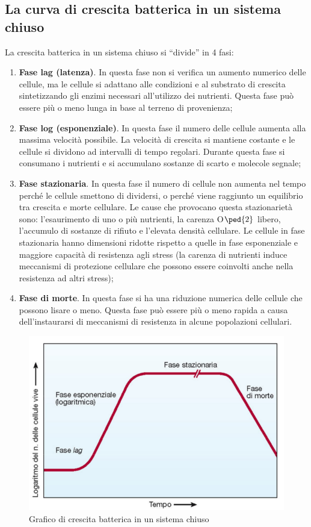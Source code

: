 \documentclass[11pt]{book}
\begin{document}
\subsection{La curva di crescita batterica in un sistema chiuso}
La crescita batterica in un sistema chiuso si ``divide'' in 4 fasi:
\begin{enumerate}
\item \textbf{Fase lag (latenza)}. In questa fase non si verifica un aumento numerico delle cellule, ma le cellule si adattano alle condizioni e al substrato di crescita sintetizzando gli enzimi necessari all’utilizzo dei
nutrienti. Questa fase può essere più o meno lunga in base al terreno di provenienza;
\item \textbf{Fase log (esponenziale)}. In questa fase il numero delle cellule aumenta alla massima velocità possibile. La velocità di crescita si mantiene costante e le cellule si dividono ad intervalli di tempo regolari. Durante questa fase si consumano i nutrienti e si accumulano sostanze di scarto e molecole segnale;
\item \textbf{Fase stazionaria}. In questa fase il numero di cellule non aumenta nel tempo perché le cellule smettono di dividersi, o perché viene raggiunto un equilibrio tra crescita e morte cellulare. Le cause che provocano questa stazionarietà sono: l'esaurimento di uno o più nutrienti, la carenza O$\ped{2}$ libero, l'accumulo di sostanze di rifiuto e l'elevata densità cellulare. Le cellule in fase stazionaria hanno dimensioni ridotte rispetto a quelle in fase esponenziale e maggiore capacità di resistenza agli stress (la carenza di nutrienti induce meccanismi di protezione cellulare che possono essere coinvolti anche nella resistenza ad altri stress);
\item \textbf{Fase di morte}. In questa fase si ha una riduzione numerica delle cellule che possono lisare o meno. Questa fase può essere più o meno rapida a causa dell'instaurarsi di meccanismi di resistenza in alcune popolazioni cellulari.
\end{enumerate}

\begin{figure}[htp]
\centering
\includegraphics[scale=0.4]{img/Crescita batterica sistema chiuso.png}
\caption{Grafico di crescita batterica in un sistema chiuso}
\label{}
\end{figure}
\end{document}
